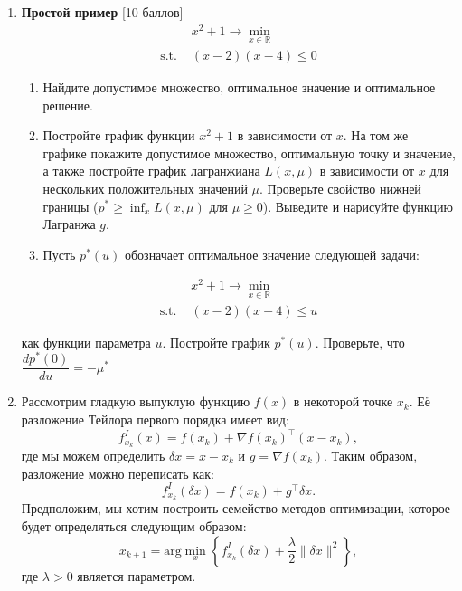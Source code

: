 \documentclass[
  russian,
  letterpaper,
  DIV=11,
  numbers=noendperiod]{scrartcl}
\providecommand{\tightlist}{%
  \setlength{\itemsep}{0pt}\setlength{\parskip}{0pt}}
\begin{document}
\begin{enumerate}
\def\labelenumi{\arabic{enumi}.}
\item
  \textbf{Простой пример} {[}10 баллов{]} \[
   \begin{split}
   & x^2 + 1 \to \min\limits_{x \in \mathbb{R} }\\
   \text{s.t. } & (x-2)(x-4) \leq 0
   \end{split}
   \]

  \begin{enumerate}
  \def\labelenumii{\arabic{enumii}.}
  \tightlist
  \item
    Найдите допустимое множество, оптимальное значение и оптимальное
    решение.
  \item
    Постройте график функции \(x^2 +1\) в зависимости от \(x\). На том
    же графике покажите допустимое множество, оптимальную точку и
    значение, а также постройте график лагранжиана \(L(x,\mu)\) в
    зависимости от \(x\) для нескольких положительных значений \(\mu\).
    Проверьте свойство нижней границы (\(p^* \geq \inf_x L(x, \mu)\) для
    \(\mu \geq 0\)). Выведите и нарисуйте функцию Лагранжа \(g\).
  \item
    Пусть \(p^*(u)\) обозначает оптимальное значение следующей задачи:
  \end{enumerate}

  \[
   \begin{split}
   & x^2 + 1 \to \min\limits_{x \in \mathbb{R} }\\
   \text{s.t. } & (x-2)(x-4) \leq u
   \end{split}
   \]

  как функции параметра \(u\). Постройте график \(p^*(u)\). Проверьте,
  что \(\dfrac{dp^*(0)}{du} = -\mu^*\)
\item
  Рассмотрим гладкую выпуклую функцию \(f(x)\) в некоторой точке
  \(x_k\). Её разложение Тейлора первого порядка имеет вид: \[
   f^I_{x_k}(x) = f(x_k) + \nabla f(x_k)^\top (x - x_k),
   \] где мы можем определить \(\delta x = x - x_k\) и
  \(g = \nabla f(x_k)\). Таким образом, разложение можно переписать как:
  \[
   f^I_{x_k}(\delta x) = f(x_k) + g^\top \delta x.
   \] Предположим, мы хотим построить семейство методов оптимизации,
  которое будет определяться следующим образом: \[
   x_{k+1} = \text{arg}\min_{x} \left\{f^I_{x_k}(\delta x) + \frac{\lambda}{2} \|\delta x\|^2\right\},
   \] где \(\lambda > 0\) является параметром.


\end{enumerate}
\end{document}
